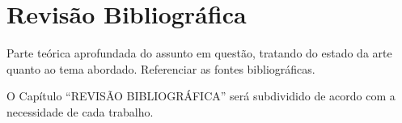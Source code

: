 \chapter{Revisão Bibliográfica}


Parte teórica aprofundada do assunto em questão, tratando do estado da arte quanto ao tema abordado. Referenciar as fontes bibliográficas. 

O Capítulo “REVISÃO BIBLIOGRÁFICA” será subdividido de acordo com a necessidade de cada trabalho.

